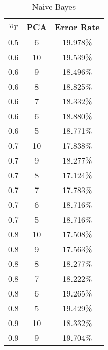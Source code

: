 \begin{center}
\begin{longtable}{|c|c|c|}
\caption{Naive Bayes}\label{tab:mvg_naiveacctable}\\
\hline
$\pi_T$ & PCA & Error Rate\\
\hline
0.5 & 6 & 19.978\% \\
\hline
0.6 & 10 & 19.539\% \\
\hline
0.6 & 9 & 18.496\% \\
\hline
0.6 & 8 & 18.825\% \\
\hline
0.6 & 7 & 18.332\% \\
\hline
0.6 & 6 & 18.880\% \\
\hline
0.6 & 5 & 18.771\% \\
\hline
0.7 & 10 & 17.838\% \\
\hline
0.7 & 9 & 18.277\% \\
\hline
0.7 & 8 & 17.124\% \\
\hline
0.7 & 7 & 17.783\% \\
\hline
0.7 & 6 & 18.716\% \\
\hline
0.7 & 5 & 18.716\% \\
\hline
0.8 & 10 & 17.508\% \\
\hline
0.8 & 9 & 17.563\% \\
\hline
0.8 & 8 & 18.277\% \\
\hline
0.8 & 7 & 18.222\% \\
\hline
0.8 & 6 & 19.265\% \\
\hline
0.8 & 5 & 19.429\% \\
\hline
0.9 & 10 & 18.332\% \\
\hline
0.9 & 9 & 19.704\% \\
\hline
\hline
\end{longtable}
\end{center}
